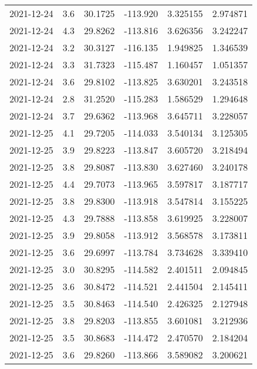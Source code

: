 \begin{tabular}{lrrrrr}
2021-12-24 &       3.6 &  30.1725 &  -113.920 &         3.325155 &         2.974871 \\
2021-12-24 &       4.3 &  29.8262 &  -113.816 &         3.626356 &         3.242247 \\
2021-12-24 &       3.2 &  30.3127 &  -116.135 &         1.949825 &         1.346539 \\
2021-12-24 &       3.3 &  31.7323 &  -115.487 &         1.160457 &         1.051357 \\
2021-12-24 &       3.6 &  29.8102 &  -113.825 &         3.630201 &         3.243518 \\
2021-12-24 &       2.8 &  31.2520 &  -115.283 &         1.586529 &         1.294648 \\
2021-12-24 &       3.7 &  29.6362 &  -113.968 &         3.645711 &         3.228057 \\
2021-12-25 &       4.1 &  29.7205 &  -114.033 &         3.540134 &         3.125305 \\
2021-12-25 &       3.9 &  29.8223 &  -113.847 &         3.605720 &         3.218494 \\
2021-12-25 &       3.8 &  29.8087 &  -113.830 &         3.627460 &         3.240178 \\
2021-12-25 &       4.4 &  29.7073 &  -113.965 &         3.597817 &         3.187717 \\
2021-12-25 &       3.8 &  29.8300 &  -113.918 &         3.547814 &         3.155225 \\
2021-12-25 &       4.3 &  29.7888 &  -113.858 &         3.619925 &         3.228007 \\
2021-12-25 &       3.9 &  29.8058 &  -113.912 &         3.568578 &         3.173811 \\
2021-12-25 &       3.6 &  29.6997 &  -113.784 &         3.734628 &         3.339410 \\
2021-12-25 &       3.0 &  30.8295 &  -114.582 &         2.401511 &         2.094845 \\
2021-12-25 &       3.6 &  30.8472 &  -114.521 &         2.441504 &         2.145411 \\
2021-12-25 &       3.5 &  30.8463 &  -114.540 &         2.426325 &         2.127948 \\
2021-12-25 &       3.8 &  29.8203 &  -113.855 &         3.601081 &         3.212936 \\
2021-12-25 &       3.5 &  30.8683 &  -114.472 &         2.470570 &         2.184204 \\
2021-12-25 &       3.6 &  29.8260 &  -113.866 &         3.589082 &         3.200621 \\

\end{tabular}

